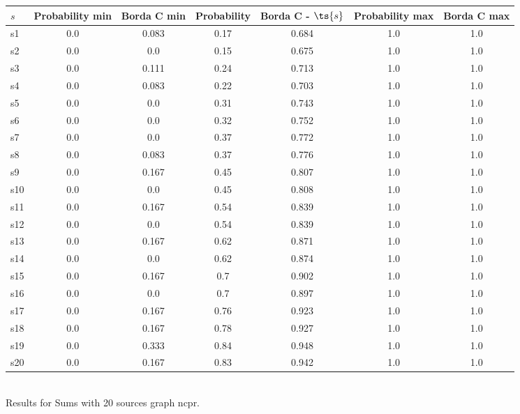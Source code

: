 \documentclass{article}
\begin{document}
\noindent\begin{tabular}{|l|c|c|c|c|c|c|}
\hline
$s$& Probability min & Borda C min & Probability & Borda C - $\ts{s}$ & Probability max & Borda C max\\
\hline
s1 &0.0 & 0.083 & 0.17 & 0.684 & 1.0 & 1.0\\
\hline
s2 &0.0 & 0.0 & 0.15 & 0.675 & 1.0 & 1.0\\
\hline
s3 &0.0 & 0.111 & 0.24 & 0.713 & 1.0 & 1.0\\
\hline
s4 &0.0 & 0.083 & 0.22 & 0.703 & 1.0 & 1.0\\
\hline
s5 &0.0 & 0.0 & 0.31 & 0.743 & 1.0 & 1.0\\
\hline
s6 &0.0 & 0.0 & 0.32 & 0.752 & 1.0 & 1.0\\
\hline
s7 &0.0 & 0.0 & 0.37 & 0.772 & 1.0 & 1.0\\
\hline
s8 &0.0 & 0.083 & 0.37 & 0.776 & 1.0 & 1.0\\
\hline
s9 &0.0 & 0.167 & 0.45 & 0.807 & 1.0 & 1.0\\
\hline
s10 &0.0 & 0.0 & 0.45 & 0.808 & 1.0 & 1.0\\
\hline
s11 &0.0 & 0.167 & 0.54 & 0.839 & 1.0 & 1.0\\
\hline
s12 &0.0 & 0.0 & 0.54 & 0.839 & 1.0 & 1.0\\
\hline
s13 &0.0 & 0.167 & 0.62 & 0.871 & 1.0 & 1.0\\
\hline
s14 &0.0 & 0.0 & 0.62 & 0.874 & 1.0 & 1.0\\
\hline
s15 &0.0 & 0.167 & 0.7 & 0.902 & 1.0 & 1.0\\
\hline
s16 &0.0 & 0.0 & 0.7 & 0.897 & 1.0 & 1.0\\
\hline
s17 &0.0 & 0.167 & 0.76 & 0.923 & 1.0 & 1.0\\
\hline
s18 &0.0 & 0.167 & 0.78 & 0.927 & 1.0 & 1.0\\
\hline
s19 &0.0 & 0.333 & 0.84 & 0.948 & 1.0 & 1.0\\
\hline
s20 &0.0 & 0.167 & 0.83 & 0.942 & 1.0 & 1.0\\
\hline
\end{tabular}\\

\noindent Results for Sums with 20 sources graph ncpr.
\end{document}
